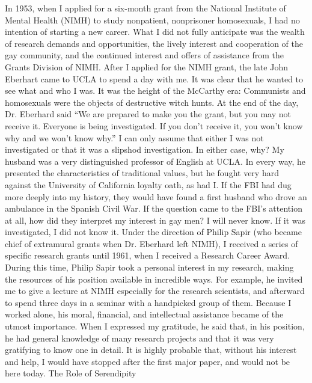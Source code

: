 In 1953, when I applied for a six-month grant from the National Institute of Mental Health (NIMH) to study nonpatient, nonprisoner homosexuals, I had no intention of starting a new career. What I did not fully anticipate was the wealth of research demands and opportunities, the lively interest and cooperation of the gay community, and the continued interest and offers of assistance from the Grants Division of NIMH.
After I applied for the NIMH grant, the late John Eberhart came to UCLA to spend a day with me. It was clear that he wanted to see what and who I was. It was the height of the McCarthy era: Communists and homosexuals were the objects of destructive witch hunts. At the end of the day, Dr. Eberhard said ``We are prepared to make you the grant, but you may not receive it. Everyone is being investigated. If you don't receive it, you won't know why and we won't know why.''
I can only assume that either I was not investigated or that it was a slipshod investigation. In either case, why? My husband was a very distinguished professor of English at UCLA. In every way, he presented the characteristics of traditional values, but he fought very hard against the University of California loyalty oath, as had I. If the FBI had dug more deeply into my history, they would have found a first husband who drove an ambulance in the Spanish Civil War. If the question came to the FBI's attention at all, how did they interpret my interest in gay men? I will never know. If it was investigated, I did not know it.
Under the direction of Philip Sapir (who became chief of extramural grants when Dr. Eberhard left NIMH), I received a series of specific research grants until 1961, when I received a Research Career Award. During this time, Philip Sapir took a personal interest in my research, making the resources of his position available in incredible ways. For example, he invited me to give a lecture at NIMH especially for the research scientists, and afterward to spend three days in a seminar with a handpicked group of them. Because I worked alone, his moral, financial, and intellectual assistance became of the utmost importance. When I expressed my gratitude, he said that, in his position, he had general knowledge of many research projects and that it was very gratifying to know one in detail. It is highly probable that, without his interest and help, I would have stopped after the first major paper, and would not be here today.
The Role of Serendipity\\
